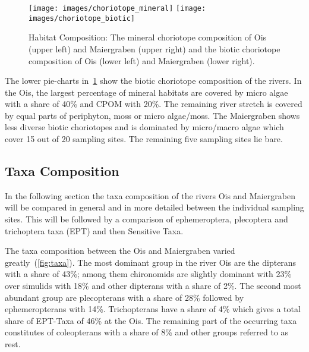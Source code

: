 \begin{figure}[!htb]                               %
  \center
  \texttt{[image: images/choriotope\_mineral]}                 %
  \texttt{[image: images/choriotope\_biotic]}                 %
      \caption{Habitat Composition: The mineral choriotope composition of Ois (upper left) and Maiergraben (upper right) and the biotic choriotope composition of Ois (lower left) and Maiergraben (lower right).}      %
  \label{fig:choriotope_composition}                                                        %
\end{figure}


The lower pie-charts in~\cref{fig:choriotope_composition} show the biotic choriotope composition of the rivers. In the Ois, the largest percentage of mineral habitats are covered by micro algae with a share of 40\% and CPOM with 20\%. The remaining river stretch is covered by equal parts of periphyton, moss or micro algae/moss. The Maiergraben shows less diverse biotic choriotopes and is dominated by micro/macro algae which cover 15 out of 20 sampling sites. The remaining five sampling sites lie bare.



\subsection{Taxa Composition}\label{sec:taxa_composition_results}       %

In the following section the taxa composition of the rivers Ois and Maiergraben will be compared in general and in more detailed between the individual sampling sites. This will be followed by a comparison of ephemeroptera, plecoptera and trichoptera taxa (EPT) and then Sensitive Taxa.



The taxa composition between the Ois and Maiergraben varied greatly~(\cref{fig:taxa}). The most dominant group in the river Ois are the dipterans with a share of 43\%; among them chironomids are slightly dominant with 23\% over simulids with 18\% and other dipterans with a share of 2\%. The second most abundant group are plecopterans with a share of 28\% followed by ephemeropterans with 14\%. Trichopterans have a share of 4\% which gives a total share of EPT-Taxa of 46\% at the Ois. The remaining part of the occurring taxa constitutes of coleopterans with a share of 8\% and other groups referred to as rest.

